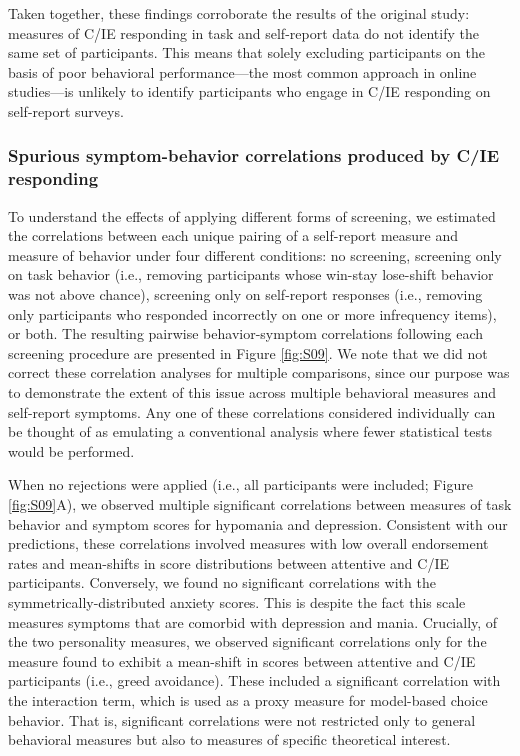 \documentclass[a4paper,notitlepage,12pt]{article}
\begin{document}
Taken together, these findings corroborate the results of the original study: measures of C/IE responding in task and self-report data do not identify the same set of participants. This means that solely excluding participants on the basis of poor behavioral performance---the most common approach in online studies---is unlikely to identify participants who engage in C/IE responding on self-report surveys. 

\subsubsection*{Spurious symptom-behavior correlations produced by C/IE responding}

To understand the effects of applying different forms of screening, we estimated the correlations between each unique pairing of a self-report measure and measure of behavior under four different conditions: no screening, screening only on task behavior (i.e., removing participants whose win-stay lose-shift behavior was not above chance), screening only on self-report responses (i.e., removing only participants who responded incorrectly on one or more infrequency items), or both. The resulting pairwise behavior-symptom correlations following each screening procedure are presented in Figure \ref{fig:S09}. We note that we did not correct these correlation analyses for multiple comparisons, since our purpose was to demonstrate the extent of this issue across multiple behavioral measures and self-report symptoms. Any one of these correlations considered individually can be thought of as emulating a conventional analysis where fewer statistical tests would be performed.

When no rejections were applied (i.e., all participants were included; Figure \ref{fig:S09}A), we observed multiple significant correlations between measures of task behavior and symptom scores for hypomania and depression. Consistent with our predictions, these correlations involved measures with low overall endorsement rates and mean-shifts in score distributions between attentive and C/IE participants. Conversely, we found no significant correlations with the symmetrically-distributed anxiety scores. This is despite the fact this scale measures symptoms that are comorbid with depression and mania. Crucially, of the two personality measures, we observed significant correlations only for the measure found to exhibit a mean-shift in scores between attentive and C/IE participants (i.e., greed avoidance). These included a significant correlation with the interaction term, which is used as a proxy measure for model-based choice behavior. That is, significant correlations were not restricted only to general behavioral measures but also to measures of specific theoretical interest.
\end{document}
